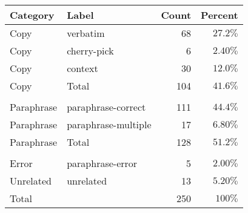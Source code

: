 \begin{tabular}{l l r r}
    \toprule Category & Label & Count & Percent \\ \midrule  Copy & verbatim & 68 & $27.2\%$\\  Copy & cherry-pick & 6 & $2.40\%$\\  Copy & context & 30 & $12.0\%$\\  \midrule Copy & Total & 104 & $41.6\%$\\\midrule\\  Paraphrase & paraphrase-correct & 111 & $44.4\%$\\  Paraphrase & paraphrase-multiple & 17 & $6.80\%$\\  \midrule Paraphrase & Total & 128 & $51.2\%$\\\midrule\\  Error & paraphrase-error & 5 & $2.00\%$\\  Unrelated & unrelated & 13 & $5.20\%$\\  \bottomrule Total && 250 & $100\%$\\  \bottomrule\end{tabular}